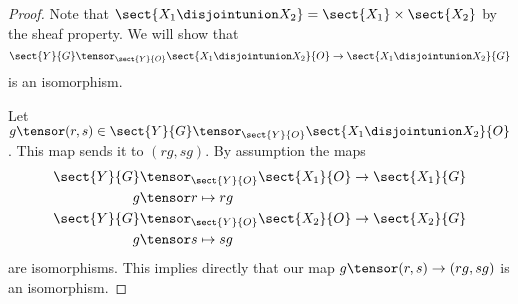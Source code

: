 \begin{proof}
Note that $\sect{X_1 \disjointunion X_2} = \sect{X_1} \times \sect{X_2}$ by the sheaf property.
We will show that
\[
\sect{Y}{G} \tensor_{\sect{Y}{O}} \sect{X_1 \disjointunion X_2}{O} \rightarrow \sect{X_1 \disjointunion X_2}{G}
\]
is an isomorphism.

Let $g \tensor (r,s) \in \sect{Y}{G} \tensor_{\sect{Y}{O}} \sect{X_1 \disjointunion X_2}{O}$.
This map sends it to $(rg,sg)$. 
By assumption the maps 
\begin{align*}
\sect{Y}{G} &\tensor_{\sect{Y}{O}} \sect{X_1}{O} \rightarrow \sect{X_1}{G}\\
 g &\tensor r \mapsto rg\\
\sect{Y}{G} &\tensor_{\sect{Y}{O}} \sect{X_2}{O} \rightarrow \sect{X_2}{G}\\
g &\tensor s \mapsto sg
\end{align*}
are isomorphisms. 
This implies directly that our map $g\tensor (r,s) \rightarrow (rg,sg)$ is an isomorphism.

\end{proof}